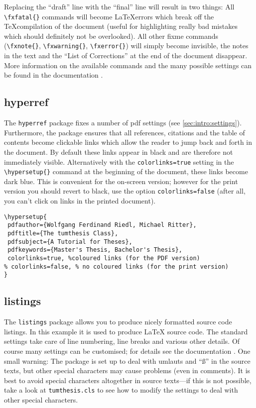 Replacing the \enquote{draft} line with the \enquote{final} line will result in two things: All \verb|\fxfatal{}| commands will become \LaTeX errors which break off the \TeX compilation of the document (useful for highlighting really bad mistakes which should definitely not be overlooked). All other fixme commands (\ie \verb|\fxnote{}|, \verb|\fxwarning{}|, \verb|\fxerror{}|) will simply become invisible, the notes in the text and the \enquote{List of Corrections} at the end of the document disappear. More information on the available commands and the many possible settings can be found in the documentation \cite{fixme}.


\subsection{hyperref}
\label{sec:intro:hyperref}

The \texttt{hyperref} package fixes a number of pdf settings (see \cref{sec:intro:settings}). Furthermore, the package ensures that all references, citations and the table of contents become clickable links which allow the reader to jump back and forth in the document. By default these links appear in black and are therefore not immediately visible. Alternatively with the \texttt{colorlinks=true} setting in the \verb|\hypersetup{}| command at the beginning of the document, these links become dark blue. This is convenient for the on-screen version; however for the print version you should revert to black, \ie use the option \texttt{colorlinks=false} (after all, you can't click on links in the printed document).

\begin{lstlisting}[language={[LaTeX]TeX}]
\hypersetup{
 pdfauthor={Wolfgang Ferdinand Riedl, Michael Ritter},
 pdftitle={The tumthesis Class},
 pdfsubject={A Tutorial for Theses},
 pdfkeywords={Master's Thesis, Bachelor's Thesis},
 colorlinks=true, %coloured links (for the PDF version)
% colorlinks=false, % no coloured links (for the print version)
}
\end{lstlisting}

\subsection{listings}
\label{sec:intro:listings}

The \texttt{listings} package allows you to produce nicely formatted source code listings. In this example it is used to produce \LaTeX{} source code. The standard settings take care of line numbering, line breaks and various other details. Of course many settings can be customised; for details see the documentation \cite{listings}. One small warning: The package is set up to deal with umlauts and \enquote{ß} in the source texts, but other special characters may cause problems (even in comments). It is best to avoid special characters altogether in source texts---if this is not possible, take a look at \texttt{tumthesis.cls} to see how to modify the settings to deal with other special characters.


